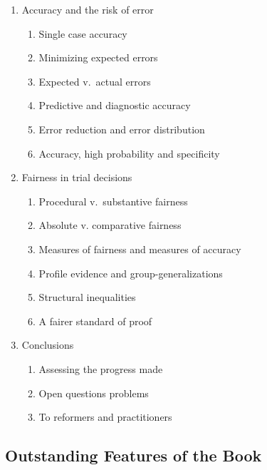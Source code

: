 \documentclass[
  10pt,
  dvipsnames,enabledeprecatedfontcommands]{scrartcl}
\begin{document}
\begin{enumerate}
\begin{enumerate}
  \item  Accuracy and the risk of error
  \begin{enumerate}
  \item  Single case accuracy
  \item  Minimizing expected errors
  \item  Expected v.\ actual errors
  \item  Predictive and diagnostic accuracy
  \item  Error reduction and error distribution
  \item  Accuracy, high probability and specificity 
  \end{enumerate}


  \item  Fairness in trial decisions
  \begin{enumerate}
  \item  Procedural v.\ substantive fairness
  \item  Absolute v. comparative fairness 
  \item  Measures of fairness and measures of accuracy 
  \item  Profile evidence and group-generalizations
  \item  Structural inequalities 
  \item  A fairer standard of proof
  \end{enumerate}


\item Conclusions
\begin{enumerate}
\item  Assessing the progress made
\item  Open questions problems 
\item  To reformers and practitioners
\end{enumerate}
\end{enumerate}
\end{enumerate}

\hypertarget{outstanding-features-of-the-book}{%
\subsection{Outstanding Features of the
Book}\label{outstanding-features-of-the-book}}
\end{document}
